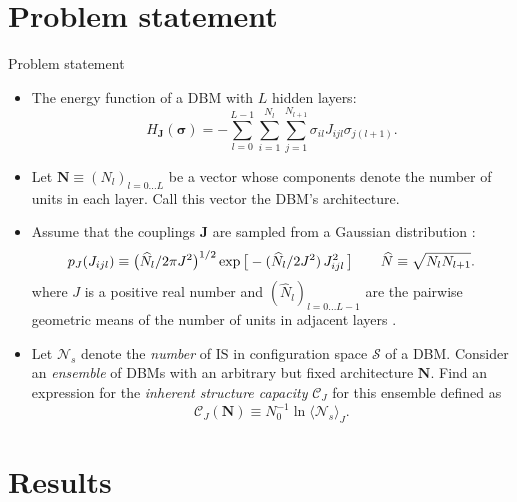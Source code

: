 \documentclass[8pt]{beamer}
\begin{document}
\section{Problem statement}
\label{sec:org76f4fa2}

\begin{frame}[label={sec:org621e956}]{Problem statement}
\begin{itemize}
\item The energy function of a DBM with \(L\) hidden layers:
  \[
  H_{\boldsymbol{J}} (\boldsymbol{\sigma}) = - \sum_{l=0}^{L-1} \sum_{i=1}^{N_l} \sum_{j=1}^{N_{l+1}} \sigma_{il} J_{ijl} \sigma_{j(l+1)}.
  \]
\linebreak
\item Let \(\boldsymbol{N} \equiv (N_{l})_{l=0\ldots L}\) be a vector whose components denote the number of units in each layer. Call this vector the DBM's \alert{architecture}.
\linebreak
\item Assume that the couplings \(\boldsymbol{J}\) are sampled from a Gaussian distribution \cite{nishimori2001spsg}:
\[
  p_{J}(J_{ijl}) \equiv \big(\widehat{N}_{l} / 2 \pi J^2 \big)^{1/2} \exp \big[- (\widehat{N}_{l} / 2 J^{2}) \thinspace J_{ijl}^{2} \thinspace \big] \qquad \widehat{N} \equiv \sqrt{N_{l} N_{l+1}}.
  \]
where \(J\) is a positive real number and \((\widehat{N}_{l})_{l=0 \ldots L-1}\) are the pairwise geometric means of the number of units in adjacent layers \cite{hartnett2018replica}.
\linebreak
\item Let \(\mathcal{N}_{s}\) denote the \emph{number} of \(\mathrm{IS}\) in configuration space \(\mathcal{S}\) of a DBM. Consider an \emph{ensemble} of DBMs with an arbitrary but fixed architecture \(\boldsymbol{N}\). Find an expression for the \emph{inherent structure capacity} \(\mathcal{C}_{J}\) for this ensemble defined as
\begin{equation*}
\mathcal{C}_{J} (\boldsymbol{N}) \equiv N_{0}^{-1} \ln \langle \mathcal{N}_{s} \rangle_{J}.
\end{equation*}
\end{itemize}
\end{frame}

\section{Results}
\label{sec:orgf02a33e}
\end{document}
